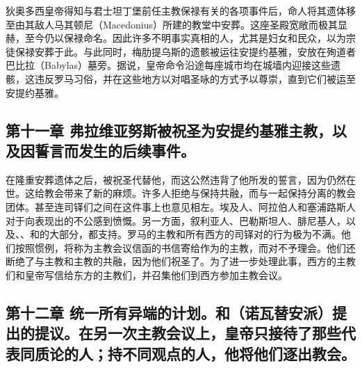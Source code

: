 狄奥多西皇帝得知与君士坦丁堡前任主教保禄有关的各项事件后，命人将其遗体移至由其敌人马其顿尼（Macedonius）所建的教堂中安葬。这座圣殿宽敞而极其显赫，至今仍以保禄命名。因此许多不明事实真相的人，尤其是妇女和民众，以为宗徒保禄安葬于此。与此同时，梅肋提乌斯的遗骸被运往安提约基雅，安放在殉道者巴比拉（Babylas）墓旁。据说，皇帝命令沿途每座城市均在城墙内迎接这些遗骸，这违反罗马习俗，并在这些地方以对唱圣咏的方式予以尊崇，直到它们被运至安提约基雅。\par


\subsection{第十一章 弗拉维亚努斯被祝圣为安提约基雅主教，以及因誓言而发生的后续事件。}

在隆重安葬遗体之后，被祝圣代替他，而这公然违背了他所发的誓言，因为仍然在世。这给教会带来了新的麻烦。许多人拒绝与保持共融，而与一起保持分离的教会团体。甚至连司铎们之间在这件事上也意见相左。埃及人、阿拉伯人和塞浦路斯人对于向表现出的不公感到愤慨。另一方面，叙利亚人、巴勒斯坦人、腓尼基人，以及、、和的大部分，都支持。罗马的主教和所有西方的司铎对的行为极为不满。他们按照惯例，将称为主教会议信函的书信寄给作为的主教，而对不予理会。他们还断绝了与主教和主教的共融，因为他们祝圣了。为了进一步处理此事，西方的主教们和皇帝写信给东方的主教们，并召集他们到西方参加主教会议。\par


\subsection{第十二章 统一所有异端的计划。和（诺瓦替安派）提出的提议。在另一次主教会议上，皇帝只接待了那些代表同质论的人；持不同观点的人，他将他们逐出教会。}

